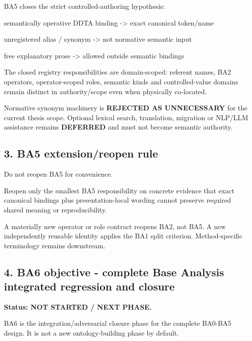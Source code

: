 \documentclass[
  10pt,
  a4paper,
]{article}
\newenvironment{Shaded}{}{}
\newcommand{\NormalTok}[1]{#1}
\begin{document}
BA5 closes the strict controlled-authoring hypothesis:

\begin{Shaded}
\begin{Highlighting}[]
\NormalTok{semantically operative DDTA binding}
\NormalTok{    {-}\textgreater{} exact canonical token/name}

\NormalTok{unregistered alias / synonym}
\NormalTok{    {-}\textgreater{} not normative semantic input}

\NormalTok{free explanatory prose}
\NormalTok{    {-}\textgreater{} allowed outside semantic bindings}
\end{Highlighting}
\end{Shaded}

The closed registry responsibilities are domain-scoped: referent names,
BA2 operators, operator-scoped roles, semantic kinds and
controlled-value domains remain distinct in authority/scope even when
physically co-located.

Normative synonym machinery is \textbf{REJECTED AS UNNECESSARY} for the
current thesis scope. Optional lexical search, translation, migration or
NLP/LLM assistance remains \textbf{DEFERRED} and must not become
semantic authority.

\subsection{3. BA5 extension/reopen
rule}\label{3-ba5-extensionreopen-rule}

Do not reopen BA5 for convenience.

Reopen only the smallest BA5 responsibility on concrete evidence that
exact canonical bindings plus presentation-local wording cannot preserve
required shared meaning or reproducibility.

A materially new operator or role contract reopens BA2, not BA5. A new
independently reusable identity applies the BA1 split criterion.
Method-specific terminology remains downstream.

\subsection{4. BA6 objective - complete Base Analysis integrated
regression and
closure}\label{4-ba6-objective---complete-base-analysis-integrated-regression-and-closure}

\textbf{Status: NOT STARTED / NEXT PHASE.}

BA6 is the integration/adversarial closure phase for the complete
BA0-BA5 design. It is not a new ontology-building phase by default.
\end{document}
